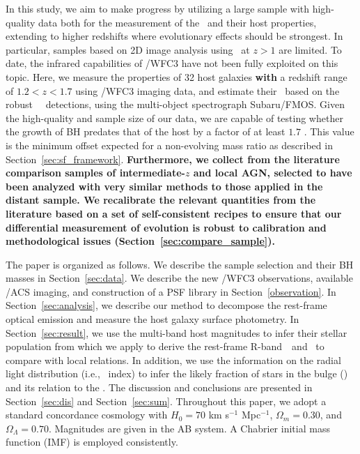 \documentclass[apj]{emulateapj}
\begin{document}
In this study, we aim to make progress by utilizing a large sample with high-quality data both for the measurement of the \mbh\ and their host properties, extending to higher redshifts where evolutionary effects should be strongest. In particular, samples based on 2D image analysis using \hst\ at $z>1$ are limited. To date, the infrared capabilities of \hst/WFC3 have not been fully exploited on this topic. Here, we measure the properties of 32 host galaxies {\bf with} a redshift range of $1.2<z<1.7$ using \hst/WFC3 imaging data, and estimate their \mbh\ based on the robust \halpha\ ~detections, using the multi-object spectrograph Subaru/FMOS. Given the high-quality and sample size of our data, we are capable of testing whether the growth of BH predates that of the host by a factor of at least $1.7$ \citep[i.e., $\sim0.23$ dex,][]{Schulze2014}. This value is the minimum offset expected for a non-evolving mass ratio as described in Section~\ref{sec:sf_framework}. {\bf Furthermore, we collect from the literature comparison samples of intermediate-$z$ and local AGN, selected to have been analyzed with very similar methods to those applied in the distant sample. We recalibrate the relevant quantities from the literature based on a set of self-consistent recipes to ensure that our differential measurement of evolution is robust to calibration and methodological issues (Section~\ref{sec:compare_sample}).}

The paper is organized as follows. We describe the sample selection and their BH masses in Section~\ref{sec:data}. We describe the new \hst/WFC3 observations, available \hst/ACS imaging, and construction of a PSF library in Section~\ref{observation}. In Section~\ref{sec:analysis}, we describe our method to decompose the rest-frame optical emission and measure the host galaxy surface photometry. In Section~\ref{sec:result}, we use the multi-band host magnitudes to infer their stellar population from which we apply to derive the rest-frame R-band \lhost\,~and \smass\ to compare with local relations. In addition, we use the information on the radial light distribution (i.e., \sersic\ index) to infer the likely fraction of stars in the bulge (\bmass) and its relation to the \mbh. The discussion and conclusions are presented in Section~\ref{sec:dis} and Section~\ref{sec:sum}. Throughout this paper, we adopt a standard concordance cosmology with $H_0= 70$ km s$^{-1}$ Mpc$^{-1}$, $\Omega{_m} = 0.30$, and $\Omega{_\Lambda} = 0.70$. Magnitudes are given in the AB system. A Chabrier initial mass function (IMF) is employed consistently.
\end{document}
